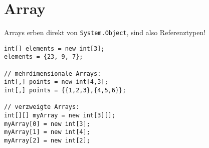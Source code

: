 \section{Array}

Arrays erben direkt von \lstinline$System.Object$, sind also Referenztypen!
\begin{lstlisting}[language={[Sharp]C}]
int[] elements = new int[3];
elements = {23, 9, 7};

// mehrdimensionale Arrays:
int[,] points = new int[4,3];
int[,] points = {{1,2,3},{4,5,6}};

// verzweigte Arrays:
int[][] myArray = new int[3][];
myArray[0] = new int[3];
myArray[1] = new int[4];
myArray[2] = new int[2];
\end{lstlisting}